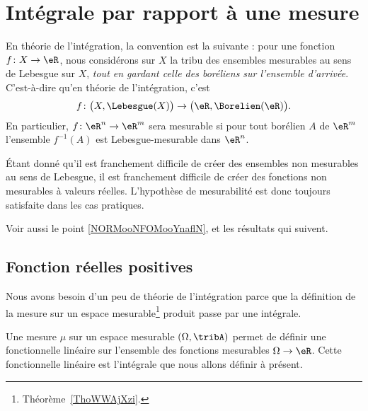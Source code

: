 \section{Intégrale par rapport à une mesure}

\begin{normaltext}      \label{NORMooFZEDooIxSgLe}
    En théorie de l'intégration, la convention est la suivante : pour une fonction \( f\colon X\to \eR\), nous considérons sur \( X\) la tribu des ensembles mesurables au sens de Lebesgue sur \( X\), \emph{tout en gardant celle des boréliens sur l'ensemble d'arrivée}. C'est-à-dire qu'en théorie de l'intégration, c'est
    \begin{equation}
        f\colon \big( X,\Lebesgue(X) \big)\to \big( \eR,\Borelien(\eR) \big).
    \end{equation}
    En particulier, \( f\colon \eR^n\to \eR^m\) sera mesurable si pour tout borélien \( A\) de \( \eR^m\) l'ensemble \( f^{-1}(A)\) est Lebesgue-mesurable dans \( \eR^n\).

    Étant donné qu'il est franchement difficile de créer des ensembles non mesurables au sens de Lebesgue, il est franchement difficile de créer des fonctions non mesurables à valeurs réelles. L'hypothèse de mesurabilité est donc toujours satisfaite dans les cas pratiques.

    Voir aussi le point \ref{NORMooNFOMooYnaflN}, et les résultats qui suivent.
\end{normaltext}

\subsection{Fonction réelles positives}

Nous avons besoin d'un peu de théorie de l'intégration parce que la définition de la mesure sur un espace mesurable\footnote{Théorème~\ref{ThoWWAjXzi}.} produit passe par une intégrale.

Une mesure \( \mu\) sur un espace mesurable \( (\Omega,\tribA)\) permet de définir une fonctionnelle linéaire sur l'ensemble des fonctions mesurables \( \Omega\to \eR\). Cette fonctionnelle linéaire est l'intégrale que nous allons définir à présent.


